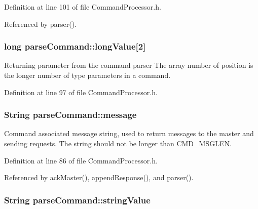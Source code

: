 Definition at line 101 of file Command\-Processor.\-h.



Referenced by parser().

\hypertarget{structparse_command_a10deac33dc255dd8a8b84532bbeb6c42}{
\subsubsection[{long\-Value}]{\setlength{\rightskip}{0pt plus 5cm}long parse\-Command\-::long\-Value\mbox{[}2\mbox{]}}}\label{structparse_command_a10deac33dc255dd8a8b84532bbeb6c42}


Returning parameter from the command parser The array number of position is the longer number of type parameters in a command. 



Definition at line 97 of file Command\-Processor.\-h.

\hypertarget{structparse_command_a5d2f84606922f34ad6a8ca5f7d8a59b5}{
\subsubsection[{message}]{\setlength{\rightskip}{0pt plus 5cm}String parse\-Command\-::message}}\label{structparse_command_a5d2f84606922f34ad6a8ca5f7d8a59b5}


Command associated message string, used to return messages to the master and sending requests. The string should not be longer than C\-M\-D\-\_\-\-M\-S\-G\-L\-E\-N. 



Definition at line 86 of file Command\-Processor.\-h.



Referenced by ack\-Master(), append\-Response(), and parser().

\hypertarget{structparse_command_ac5ece0b161e3fae794d08911247c0b1e}{
\subsubsection[{string\-Value}]{\setlength{\rightskip}{0pt plus 5cm}String parse\-Command\-::string\-Value}}\label{structparse_command_ac5ece0b161e3fae794d08911247c0b1e}


